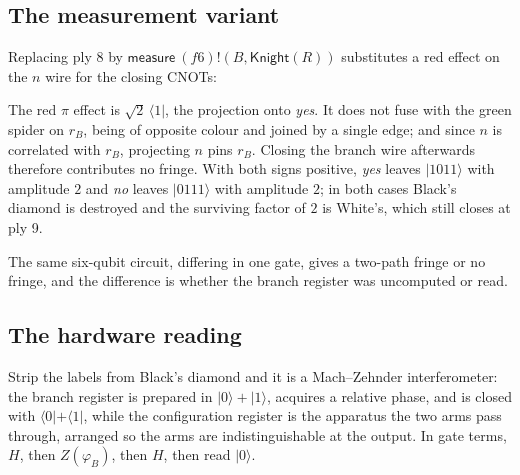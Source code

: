 \documentclass[11pt,a4paper]{article}
\theoremstyle{definition}
\theoremstyle{plain}
\newcommand{\Meas}{\textsf{measure}}
\begin{document}
\subsection{The measurement variant}

Replacing ply 8 by $\Meas\ (f6)!(B,\textsf{Knight}(R))$ substitutes a red effect
on the $n$ wire for the closing CNOTs:

\begin{center}
\end{center}

The red $\pi$ effect is $\sqrt2\,\langle 1|$, the projection onto \emph{yes}. It
does not fuse with the green spider on $r_B$, being of opposite colour and
joined by a single edge; and since $n$ is correlated with $r_B$, projecting $n$
pins $r_B$. Closing the branch wire afterwards therefore contributes no fringe.
With both signs positive, \emph{yes} leaves $|1011\rangle$ with amplitude $2$
and \emph{no} leaves $|0111\rangle$ with amplitude $2$; in both cases Black's
diamond is destroyed and the surviving factor of $2$ is White's, which still
closes at ply 9.

The same six-qubit circuit, differing in one gate, gives a two-path fringe or no
fringe, and the difference is whether the branch register was uncomputed or
read.

\subsection{The hardware reading}

Strip the labels from Black's diamond and it is a Mach--Zehnder interferometer:
the branch register is prepared in $|0\rangle+|1\rangle$, acquires a relative
phase, and is closed with $\langle 0|+\langle 1|$, while the configuration
register is the apparatus the two arms pass through, arranged so the arms are
indistinguishable at the output. In gate terms, $H$, then $Z(\varphi_B)$, then
$H$, then read $|0\rangle$.
\end{document}
